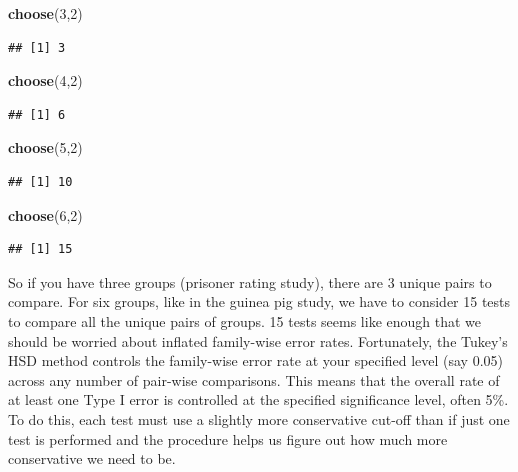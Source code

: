 \documentclass[]{book}
\newenvironment{Shaded}{\begin{snugshade}}{\end{snugshade}}
\newcommand{\KeywordTok}[1]{\textcolor[rgb]{0.13,0.29,0.53}{\textbf{#1}}}
\newcommand{\DecValTok}[1]{\textcolor[rgb]{0.00,0.00,0.81}{#1}}
\newcommand{\NormalTok}[1]{#1}
\theoremstyle{definition}
\theoremstyle{definition}
\theoremstyle{remark}
\begin{document}
\begin{Shaded}
\begin{Highlighting}[]
\KeywordTok{choose}\NormalTok{(}\DecValTok{3}\NormalTok{,}\DecValTok{2}\NormalTok{)}
\end{Highlighting}
\end{Shaded}

\begin{verbatim}
## [1] 3
\end{verbatim}

\begin{Shaded}
\begin{Highlighting}[]
\KeywordTok{choose}\NormalTok{(}\DecValTok{4}\NormalTok{,}\DecValTok{2}\NormalTok{)}
\end{Highlighting}
\end{Shaded}

\begin{verbatim}
## [1] 6
\end{verbatim}

\begin{Shaded}
\begin{Highlighting}[]
\KeywordTok{choose}\NormalTok{(}\DecValTok{5}\NormalTok{,}\DecValTok{2}\NormalTok{)}
\end{Highlighting}
\end{Shaded}

\begin{verbatim}
## [1] 10
\end{verbatim}

\begin{Shaded}
\begin{Highlighting}[]
\KeywordTok{choose}\NormalTok{(}\DecValTok{6}\NormalTok{,}\DecValTok{2}\NormalTok{)}
\end{Highlighting}
\end{Shaded}

\begin{verbatim}
## [1] 15
\end{verbatim}

So if you have three groups (prisoner rating study), there are 3 unique
pairs to compare. For six groups, like in the guinea pig study, we have
to consider 15 tests to compare all the unique pairs of groups. 15 tests
seems like enough that we should be worried about inflated family-wise
error rates. Fortunately, the Tukey's HSD method controls the
family-wise error rate at your specified level (say 0.05) across any
number of pair-wise comparisons. This means that the overall rate of at
least one Type I error is controlled at the specified significance
level, often 5\%. To do this, each test must use a slightly more
conservative cut-off than if just one test is performed and the
procedure helps us figure out how much more conservative we need to be.
\end{document}
